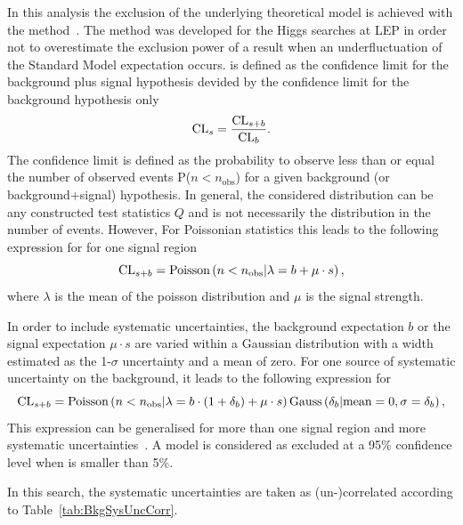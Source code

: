In this analysis the exclusion of the underlying theoretical model is achieved with the \CLs method~\cite{bib:CLS_1999,bib:CLS_2000,bib:CLS_2002}.
The \CLs method was developed for the Higgs searches at LEP in order not to overestimate the exclusion power of a result when an  underfluctuation of the Standard Model expectation occurs.
\CLs is defined as the confidence limit for the background plus signal hypothesis devided by the confidence limit for the background hypothesis only
\begin{equation*}
\text{CL}_{s} = \frac{\text{CL}_{s+b}}{\text{CL}_{b}}.
\end{equation*}
The confidence limit is defined as the probability to observe less than or equal the number of observed events P($n<n_{\text{obs}}$) for a given background (or background+signal) hypothesis.
In general, the considered distribution can be any constructed test statistics $Q$ and is not necessarily the distribution in the number of events.
However, For Poissonian statistics this leads to the following expression for \CLb for one signal region
\begin{equation*}
\text{CL}_{s+b} = \text{Poisson}\left( n<n_{\text{obs}} |\lambda = b+\mu\cdot s   \right),
\end{equation*}
where $\lambda$ is the mean of the poisson distribution and $\mu$ is the signal strength.

In order to include systematic uncertainties, the background expectation $b$ or the signal expectation $\mu\cdot s$ are varied within a Gaussian distribution with a width estimated as the 1-$\sigma$ uncertainty and a mean of zero.
For one source of systematic uncertainty on the background, it leads to the following expression for \CLsb
\begin{equation*}
\text{CL}_{s+b} = \text{Poisson}\left( n<n_{\text{obs}} |\lambda = b \cdot (1+\delta_b)+\mu\cdot s   \right) \text{Gauss}\left(\delta_b|\text{mean}=0, \sigma = \delta_b\right),
\end{equation*}
This expression can be generalised for more than one signal region and more systematic uncertainties~\cite{bib:Ott_Thesis}.
A model is considered as excluded at a 95\% confidence level when \CLs is smaller than 5\%.



In this search, the systematic uncertainties are taken as (un-)correlated according to Table~\ref{tab:BkgSysUncCorr}.

